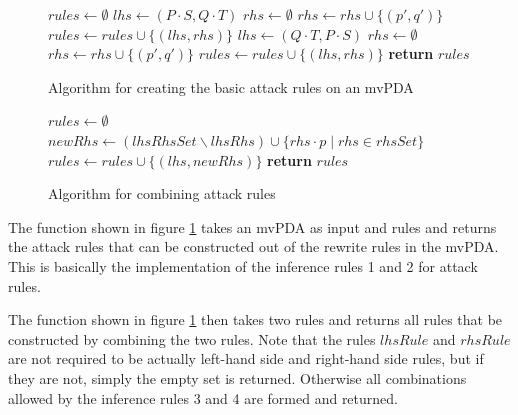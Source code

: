 \begin{figure}[H]
\begin{algorithmic}[1]
  \State $rules ← ∅$
      \State $lhs ← (P⋅S, Q⋅T)$
        \State $rhs ← ∅$
          \State $rhs ← rhs ∪ \{ (p', q') \}$
        \EndFor
        \State $rules ← rules ∪ \{(lhs, rhs)\}$
      \EndFor
      \State $lhs ← (Q⋅T, P⋅S)$
        \State $rhs ← ∅$
          \State $rhs ← rhs ∪ \{ (p', q') \}$
        \EndFor
        \State $rules ← rules ∪ \{(lhs, rhs)\}$
      \EndFor
  \EndFor
  \State \textbf{return} $rules$
\EndFunction
\end{algorithmic}
\caption{Algorithm for creating the basic attack rules on an mvPDA}
\label{alg:make-rules}
\end{figure}

\begin{figure}[H]
\begin{algorithmic}[1]
  \State $rules ← ∅$
      \State $newRhs ← (lhsRhsSet ∖ lhsRhs) ∪ \{ rhs⋅p \mid rhs ∈ rhsSet \}$
      \State $rules ← rules ∪ \{ (lhs, newRhs) \}$
    \EndFor
  \EndIf
  \State \textbf{return} $rules$
\EndFunction
\end{algorithmic}
\caption{Algorithm for combining attack rules}
\label{alg:rule-combining}
\end{figure}

The function {} shown in figure \ref{alg:make-rules}
takes an mvPDA as input and rules and returns the attack rules
that can be constructed out of the rewrite rules in the mvPDA.
This is basically the implementation of the inference rules 1 and 2
for attack rules.

The function {} shown in figure \ref{alg:make-rules}
then takes two rules and returns all rules that be constructed by
combining the two rules.
Note that the rules $lhsRule$ and $rhsRule$ are not required to
be actually left-hand side and right-hand side rules, but if they are
not, simply the empty set is returned.
Otherwise all combinations allowed by the inference rules 3 and 4
are formed and returned.

